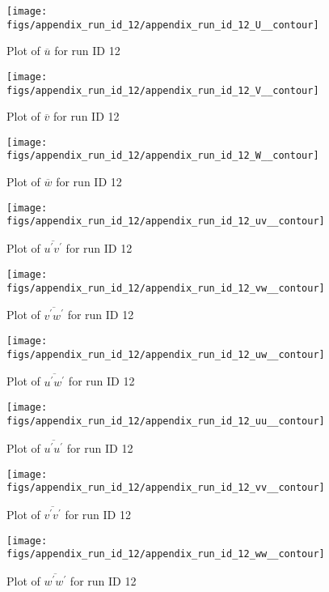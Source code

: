 \begin{figure}[H]
\centering
\texttt{[image: figs/appendix\_run\_id\_12/appendix\_run\_id\_12\_U\_\_contour]}
\caption{Plot of $\overline{u}$ for run ID 12}
\label{fig:appendix_run_id_12_U__contour}
\end{figure}


\begin{figure}[H]
\centering
\texttt{[image: figs/appendix\_run\_id\_12/appendix\_run\_id\_12\_V\_\_contour]}
\caption{Plot of $\overline{v}$ for run ID 12}
\label{fig:appendix_run_id_12_V__contour}
\end{figure}


\begin{figure}[H]
\centering
\texttt{[image: figs/appendix\_run\_id\_12/appendix\_run\_id\_12\_W\_\_contour]}
\caption{Plot of $\overline{w}$ for run ID 12}
\label{fig:appendix_run_id_12_W__contour}
\end{figure}


\begin{figure}[H]
\centering
\texttt{[image: figs/appendix\_run\_id\_12/appendix\_run\_id\_12\_uv\_\_contour]}
\caption{Plot of $\overline{u^\prime v^\prime}$ for run ID 12}
\label{fig:appendix_run_id_12_uv__contour}
\end{figure}


\begin{figure}[H]
\centering
\texttt{[image: figs/appendix\_run\_id\_12/appendix\_run\_id\_12\_vw\_\_contour]}
\caption{Plot of $\overline{v^\prime w^\prime}$ for run ID 12}
\label{fig:appendix_run_id_12_vw__contour}
\end{figure}


\begin{figure}[H]
\centering
\texttt{[image: figs/appendix\_run\_id\_12/appendix\_run\_id\_12\_uw\_\_contour]}
\caption{Plot of $\overline{u^\prime w^\prime}$ for run ID 12}
\label{fig:appendix_run_id_12_uw__contour}
\end{figure}


\begin{figure}[H]
\centering
\texttt{[image: figs/appendix\_run\_id\_12/appendix\_run\_id\_12\_uu\_\_contour]}
\caption{Plot of $\overline{u^\prime u^\prime}$ for run ID 12}
\label{fig:appendix_run_id_12_uu__contour}
\end{figure}


\begin{figure}[H]
\centering
\texttt{[image: figs/appendix\_run\_id\_12/appendix\_run\_id\_12\_vv\_\_contour]}
\caption{Plot of $\overline{v^\prime v^\prime}$ for run ID 12}
\label{fig:appendix_run_id_12_vv__contour}
\end{figure}


\begin{figure}[H]
\centering
\texttt{[image: figs/appendix\_run\_id\_12/appendix\_run\_id\_12\_ww\_\_contour]}
\caption{Plot of $\overline{w^\prime w^\prime}$ for run ID 12}
\label{fig:appendix_run_id_12_ww__contour}
\end{figure}


